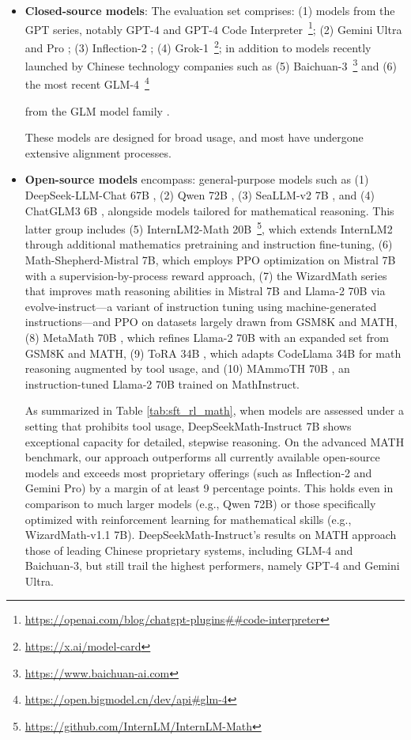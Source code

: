 \begin{itemize}[topsep=0pt]
    \item \textbf{Closed-source models}: The evaluation set comprises: (1) models from the GPT series, notably GPT-4 \citep{gpt4} and GPT-4 Code Interpreter~\footnote{\url{https://openai.com/blog/chatgpt-plugins\#\#code-interpreter}}; (2) Gemini Ultra and Pro \citep{gemini}; (3) Inflection-2 \citep{inflection-2}; (4) Grok-1~\footnote{\url{https://x.ai/model-card}}; in addition to models recently launched by Chinese technology companies such as (5) Baichuan-3~\footnote{\url{https://www.baichuan-ai.com}} and (6) the most recent GLM-4~\footnote{\url{https://open.bigmodel.cn/dev/api\#glm-4}}

    from the GLM model family \citep{glm}.

These models are designed for broad usage, and most have undergone extensive alignment processes. 
\item \textbf{Open-source models} encompass: general-purpose models such as (1) DeepSeek-LLM-Chat 67B \citep{deepseek-llm}, (2) Qwen 72B \citep{qwen}, (3) SeaLLM-v2 7B \citep{seallm}, and (4) ChatGLM3 6B \citep{chatglm3}, alongside models tailored for mathematical reasoning. This latter group includes (5) InternLM2-Math 20B~\footnote{\url{https://github.com/InternLM/InternLM-Math}}, which extends InternLM2 through additional mathematics pretraining and instruction fine-tuning, (6) Math-Shepherd-Mistral 7B, which employs PPO optimization \citep{schulman2017proximal} on Mistral 7B \citep{mistral} with a supervision-by-process reward approach, (7) the WizardMath series \citep{wizardmath} that improves math reasoning abilities in Mistral 7B and Llama-2 70B \citep{llama2} via evolve-instruct—a variant of instruction tuning using machine-generated instructions—and PPO on datasets largely drawn from GSM8K and MATH, (8) MetaMath 70B \citep{metamath}, which refines Llama-2 70B with an expanded set from GSM8K and MATH, (9) ToRA 34B \cite{tora}, which adapts CodeLlama 34B for math reasoning augmented by tool usage, and (10) MAmmoTH 70B \citep{MathInstruct}, an instruction-tuned Llama-2 70B trained on MathInstruct.

As summarized in Table \ref{tab:sft_rl_math}, when models are assessed under a setting that prohibits tool usage, DeepSeekMath-Instruct 7B shows exceptional capacity for detailed, stepwise reasoning. On the advanced MATH benchmark, our approach outperforms all currently available open-source models and exceeds most proprietary offerings (such as Inflection-2 and Gemini Pro) by a margin of at least 9 percentage points. This holds even in comparison to much larger models (e.g., Qwen 72B) or those specifically optimized with reinforcement learning for mathematical skills (e.g., WizardMath-v1.1 7B). DeepSeekMath-Instruct’s results on MATH approach those of leading Chinese proprietary systems, including GLM-4 and Baichuan-3, but still trail the highest performers, namely GPT-4 and Gemini Ultra.


\end{itemize}
